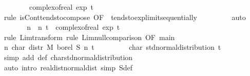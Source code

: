 {\ \ \ \ \ \ \ \ complex{\isacharunderscore}of{\isacharunderscore}real\ {\isacharparenleft}exp\ {\isacharparenleft}{\isacharminus}{\isacharparenleft}t{\isacharcircum}{}{\isacharparenright}\ {\isacharslash}\ {}{\isacharparenright}{\isacharparenright}{\isachardoublequoteclose}\isanewline
\ \ \ \ \ \ \isamarkupfalse%
\ {\isacharparenleft}rule\ isCont{\isacharunderscore}tendsto{\isacharunderscore}compose\ {\isacharbrackleft}OF\ {\isacharunderscore}\ tendsto{\isacharunderscore}exp{\isacharunderscore}limit{\isacharunderscore}sequentially{\isacharbrackright}{\isacharparenright}\isanewline
\ \ \ \ \ \ \ \ \ auto\isanewline
\ \ \ \ \isamarkupfalse%
\ \isamarkupfalse%
\ {\isachardoublequoteopen}{\isacharparenleft}{\isasymlambda}n{\isachardot}\ {\isasymphi}\ n\ t{\isacharparenright}\ {\isasymlonglonglongrightarrow}\ complex{\isacharunderscore}of{\isacharunderscore}real\ {\isacharparenleft}exp\ {\isacharparenleft}{\isacharminus}{\isacharparenleft}t{\isacharcircum}{}{\isacharparenright}\ {\isacharslash}\ {}{\isacharparenright}{\isacharparenright}{\isachardoublequoteclose}\isanewline
\ \ \ \ \ \ \isamarkupfalse%
\ {\isacharparenleft}rule\ Lim{\isacharunderscore}transform{\isacharparenright}\ {\isacharparenleft}rule\ Lim{\isacharunderscore}null{\isacharunderscore}comparison\ {\isacharbrackleft}OF\ main\ {\isacharasterisk}{\isacharbrackright}{\isacharparenright}\isanewline
\ \ \ \ \isamarkupfalse%
\ \isamarkupfalse%
\ {\isachardoublequoteopen}{\isacharparenleft}{\isasymlambda}n{\isachardot}\ char\ {\isacharparenleft}distr\ M\ borel\ {\isacharparenleft}{\isacharquery}S{\isacharprime}\ n{\isacharparenright}{\isacharparenright}\ t{\isacharparenright}\ {\isasymlonglonglongrightarrow}\isanewline
\ \ \ \ \ \ \ \ char\ std{\isacharunderscore}normal{\isacharunderscore}distribution\ t{\isachardoublequoteclose}\isanewline
\ \ \ \ \ \ \isamarkupfalse%
\ {\isacharparenleft}simp\ add{\isacharcolon}\ {\isasymphi}{\isacharunderscore}def\ char{\isacharunderscore}std{\isacharunderscore}normal{\isacharunderscore}distribution{\isacharparenright}\isanewline
\ \ \isamarkupfalse%
\ {\isacharparenleft}auto\ intro{\isacharbang}{\isacharcolon}\ real{\isacharunderscore}dist{\isacharunderscore}normal{\isacharunderscore}dist\ simp{\isacharcolon}\ S{\isacharunderscore}def{\isacharparenright}\isanewline
{}\isamarkupfalse%
%
\endisatagproof
{\isafoldproof}%
%
\isadelimproof
\isanewline
%
\endisadelimproof
\isanewline
}
